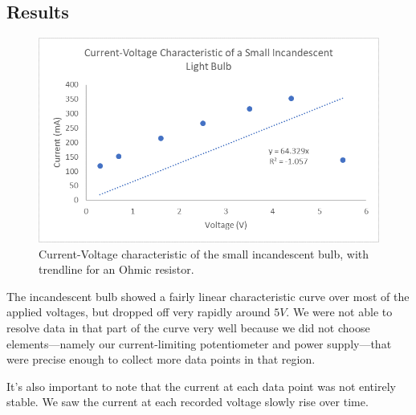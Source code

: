 \documentclass[a4paper, 11pt]{article}
\begin{document}
    \subsection{Results}


        \begin{figure}[H]
            \centering
            \includegraphics{PH425-Lab1-2a-R.png}
            \caption{Current-Voltage characteristic of the small incandescent bulb, with trendline for an Ohmic resistor.}
            \label{fig:results-2a}
        \end{figure}

        The incandescent bulb showed a fairly linear characteristic curve over most of the applied voltages, but dropped off very rapidly around \( 5 V \). We were not able to resolve data in that part of the curve very well because we did not choose elements---namely our current-limiting potentiometer and power supply---that were precise enough to collect more data points in that region. \
        
        It's also important to note that the current at each data point was not entirely stable. We saw the current at each recorded voltage slowly rise over time.
\end{document}
